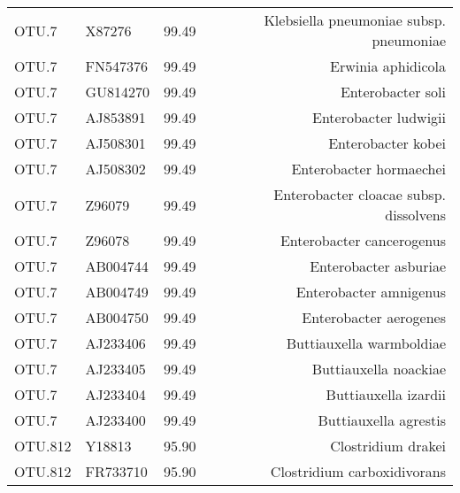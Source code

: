 \begin{tabular}{llrr}
  OTU.7 & X87276 & 99.49 & Klebsiella pneumoniae subsp. pneumoniae \\ 
  OTU.7 & FN547376 & 99.49 & Erwinia aphidicola \\ 
  OTU.7 & GU814270 & 99.49 & Enterobacter soli \\ 
  OTU.7 & AJ853891 & 99.49 & Enterobacter ludwigii \\ 
  OTU.7 & AJ508301 & 99.49 & Enterobacter kobei \\ 
  OTU.7 & AJ508302 & 99.49 & Enterobacter hormaechei \\ 
  OTU.7 & Z96079 & 99.49 & Enterobacter cloacae subsp. dissolvens \\ 
  OTU.7 & Z96078 & 99.49 & Enterobacter cancerogenus \\ 
  OTU.7 & AB004744 & 99.49 & Enterobacter asburiae \\ 
  OTU.7 & AB004749 & 99.49 & Enterobacter amnigenus \\ 
  OTU.7 & AB004750 & 99.49 & Enterobacter aerogenes \\ 
  OTU.7 & AJ233406 & 99.49 & Buttiauxella warmboldiae \\ 
  OTU.7 & AJ233405 & 99.49 & Buttiauxella noackiae \\ 
  OTU.7 & AJ233404 & 99.49 & Buttiauxella izardii \\ 
  OTU.7 & AJ233400 & 99.49 & Buttiauxella agrestis \\ 
  OTU.812 & Y18813 & 95.90 & Clostridium drakei \\ 
  OTU.812 & FR733710 & 95.90 & Clostridium carboxidivorans \\ 
   \hline
\end{tabular}
